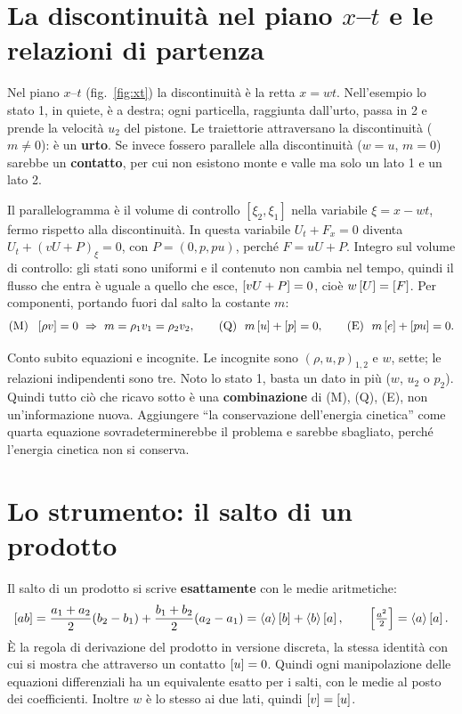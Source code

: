 \section*{La discontinuità nel piano $x$--$t$ e le relazioni di partenza}
Nel piano $x$--$t$ (fig.~\ref{fig:xt}) la discontinuità è la retta $x=wt$. Nell'esempio lo stato 1, in quiete, è a
destra; ogni particella, raggiunta dall'urto, passa in 2 e prende la velocità $u_2$ del pistone. Le traiettorie
attraversano la discontinuità ($m\neq0$): è un \textbf{urto}. Se invece fossero parallele alla discontinuità
($w=u$, $m=0$) sarebbe un \textbf{contatto}, per cui non esistono monte e valle ma solo un lato 1 e un lato 2.

Il parallelogramma è il volume di controllo $[\xi_2,\xi_1]$ nella variabile $\xi=x-wt$, fermo rispetto alla
discontinuità. In questa variabile $U_t+F_x=0$ diventa $U_t+(vU+P)_\xi=0$, con $P=(0,p,pu)$, perché $F=uU+P$.
Integro sul volume di controllo: gli stati sono uniformi e il contenuto non cambia nel tempo, quindi il flusso che
entra è uguale a quello che esce, $\left[vU+P\right]=0$, cioè $w\left[U\right]=\left[F\right]$. Per componenti, portando fuori dal salto la
costante $m$:
\begin{gather*}
  \text{(M)}\ \ \left[\rho v\right]=0\ \Rightarrow\ m=\rho_1v_1=\rho_2v_2 ,\qquad
  \text{(Q)}\ \ m\left[u\right]+\left[p\right]=0 ,\qquad
  \text{(E)}\ \ m\left[e\right]+\left[pu\right]=0 .
\end{gather*}

Conto subito equazioni e incognite. Le incognite sono $(\rho,u,p)_{1,2}$ e $w$, sette; le relazioni indipendenti
sono tre. Noto lo stato 1, basta un dato in più ($w$, $u_2$ o $p_2$). Quindi tutto ciò che ricavo sotto è una
\textbf{combinazione} di (M), (Q), (E), non un'informazione nuova. Aggiungere ``la conservazione dell'energia
cinetica'' come quarta equazione sovradeterminerebbe il problema e sarebbe sbagliato, perché l'energia cinetica
non si conserva.

\section*{Lo strumento: il salto di un prodotto}
Il salto di un prodotto si scrive \textbf{esattamente} con le medie aritmetiche:
\begin{gather*}
  \left[ab\right]=\frac{a_1+a_2}{2}(b_2-b_1)+\frac{b_1+b_2}{2}(a_2-a_1)=\left\langle a\right\rangle\left[b\right]+\left\langle b\right\rangle\left[a\right] ,\qquad
  \left[\tfrac{a^2}{2}\right]=\left\langle a\right\rangle\left[a\right].
\end{gather*}
È la regola di derivazione del prodotto in versione discreta, la stessa identità con cui si mostra che attraverso
un contatto $\left[u\right]=0$. Quindi ogni manipolazione delle equazioni differenziali ha un equivalente esatto per i
salti, con le medie al posto dei coefficienti. Inoltre $w$ è lo stesso ai due lati, quindi $\left[v\right]=\left[u\right]$.

